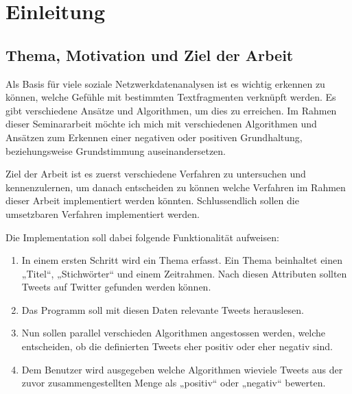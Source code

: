 \section{Einleitung}
\subsection{Thema, Motivation und Ziel der Arbeit}
Als Basis für viele soziale Netzwerkdatenanalysen ist es wichtig erkennen zu können, welche Gefühle mit bestimmten Textfragmenten verknüpft werden.
Es gibt verschiedene Ansätze und Algorithmen, um dies zu erreichen. Im Rahmen dieser Seminararbeit möchte ich mich mit verschiedenen Algorithmen 
und Ansätzen zum Erkennen einer negativen oder positiven Grundhaltung, beziehungsweise Grundstimmung auseinandersetzen.

Ziel der Arbeit ist es zuerst verschiedene Verfahren zu untersuchen und kennenzulernen, um danach entscheiden zu können welche Verfahren im 
Rahmen dieser Arbeit implementiert werden könnten. Schlussendlich sollen die umsetzbaren Verfahren implementiert werden.

Die Implementation soll dabei folgende Funktionalität aufweisen:
\begin{enumerate}
\item In einem ersten Schritt wird ein Thema erfasst. Ein Thema beinhaltet einen „Titel“, „Stichwörter“ und einem Zeitrahmen. Nach diesen Attributen sollten Tweets auf Twitter gefunden werden können.
\item Das Programm soll mit diesen Daten relevante Tweets herauslesen.
\item Nun sollen parallel verschieden Algorithmen angestossen werden, welche entscheiden, ob die definierten Tweets eher positiv oder eher negativ sind.
\item Dem Benutzer wird ausgegeben welche Algorithmen wieviele Tweets aus der zuvor zusammengestellten Menge als „positiv“ oder „negativ“ bewerten.
\end{enumerate}

